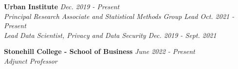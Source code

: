 
\textbf{Urban Institute} \hfill \textit{Dec. 2019 - Present}\\
    \textit{Principal Research Associate and Statistical Methods Group Lead \hfill Oct. 2021 - Present}\\
    \textit{Lead Data Scientist, Privacy and Data Security \hfill Dec. 2019 - Sept. 2021}

\workspace
    \textbf{Stonehill College - School of Business} \hfill \textit{June 2022 - Present}\\
    \textit{Adjunct Professor}

